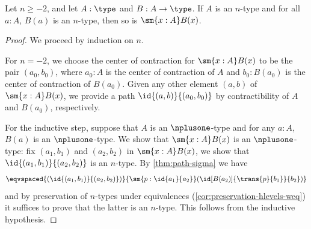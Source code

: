 %
\begin{thm}\label{thm:ntypes-sigma}
 Let $n \geq -2$, and let $A : \type$ and $B : A \to \type$.
 If $A$ is an $n$-type and for all $a : A$, $B(a)$ is an $n$-type, then so is $\sm{x : A} B(x)$.
\end{thm}

\begin{proof}
 We proceed by induction on $n$.

 For $n = -2$, we choose the center of contraction for $\sm{x : A} B(x)$ to be the pair
       $(a_0, b_0)$, where $a_0 : A$ is the center of contraction of $A$ and $b_0 : B(a_0)$ is the center of contraction of $B(a_0)$.
       Given any other element $(a,b)$ of $\sm{x : A} B(x)$, we provide a path $\id{(a, b)}{(a_0,b_0)}$
       by contractibility of $A$ and $B(a_0)$, respectively.

 For the inductive step, suppose that $A$ is an $\nplusone$-type and
         for any $a : A$, $B(a)$ is an $\nplusone$-type. We show that $\sm{x : A} B(x)$ is an $\nplusone$-type:
      fix $(a_1, b_1)$ and $(a_2,b_2)$ in $\sm{x : A} B(x)$,
     we show that $\id{(a_1, b_1)}{(a_2,b_2)}$ is an $n$-type.
      By \cref{thm:path-sigma} we have
      \[ \eqvspaced{(\id{(a_1, b_1)}{(a_2,b_2)})}{\sm{p : \id{a_1}{a_2}} (\id[B(a_2)]{\trans{p}{b_1}}{b_2})} \]
   and by preservation of $n$-types under equivalences (\cref{cor:preservation-hlevels-weq})
   it suffices to prove that the latter is an $n$-type. This follows from the
   inductive hypothesis.
\end{proof}
